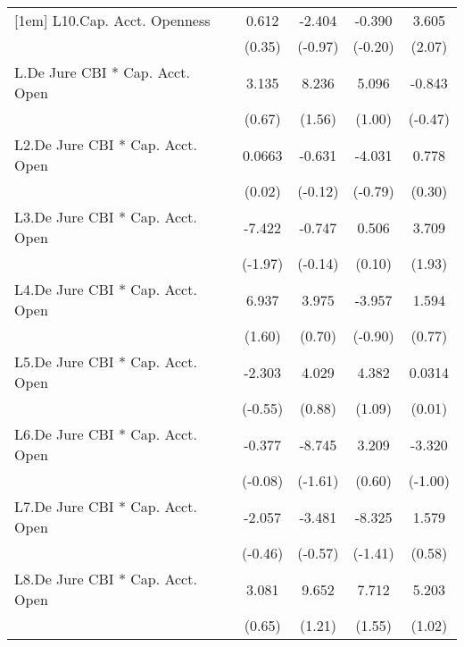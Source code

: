 {\begin{longtable}{l*{4}{c}}
[1em]
L10.Cap. Acct. Openness&    0.612         &   -2.404         &   -0.390         &    3.605\sym{*}  \\
                &   (0.35)         &  (-0.97)         &  (-0.20)         &   (2.07)         \\
[1em]
L.De Jure CBI * Cap. Acct. Open&    3.135         &    8.236         &    5.096         &   -0.843         \\
                &   (0.67)         &   (1.56)         &   (1.00)         &  (-0.47)         \\
[1em]
L2.De Jure CBI * Cap. Acct. Open&   0.0663         &   -0.631         &   -4.031         &    0.778         \\
                &   (0.02)         &  (-0.12)         &  (-0.79)         &   (0.30)         \\
[1em]
L3.De Jure CBI * Cap. Acct. Open&   -7.422\sym{*}  &   -0.747         &    0.506         &    3.709         \\
                &  (-1.97)         &  (-0.14)         &   (0.10)         &   (1.93)         \\
[1em]
L4.De Jure CBI * Cap. Acct. Open&    6.937         &    3.975         &   -3.957         &    1.594         \\
                &   (1.60)         &   (0.70)         &  (-0.90)         &   (0.77)         \\
[1em]
L5.De Jure CBI * Cap. Acct. Open&   -2.303         &    4.029         &    4.382         &   0.0314         \\
                &  (-0.55)         &   (0.88)         &   (1.09)         &   (0.01)         \\
[1em]
L6.De Jure CBI * Cap. Acct. Open&   -0.377         &   -8.745         &    3.209         &   -3.320         \\
                &  (-0.08)         &  (-1.61)         &   (0.60)         &  (-1.00)         \\
[1em]
L7.De Jure CBI * Cap. Acct. Open&   -2.057         &   -3.481         &   -8.325         &    1.579         \\
                &  (-0.46)         &  (-0.57)         &  (-1.41)         &   (0.58)         \\
[1em]
L8.De Jure CBI * Cap. Acct. Open&    3.081         &    9.652         &    7.712         &    5.203         \\
                &   (0.65)         &   (1.21)         &   (1.55)         &   (1.02)         \\

\end{longtable}}
